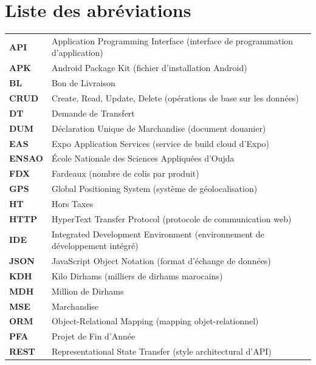 \documentclass[12pt,a4paper]{article}
\begin{document}
\newpage

    \renewcommand{\contentsname}{Table des matières}
    \renewcommand{\listfigurename}{Liste des figures}
    \setcounter{tocdepth}{1}
    \tableofcontents
\newpage
    \listoffigures
    \section*{Liste des abréviations}
    \begin{longtable}{p{2.5cm} p{12cm}}
    \textbf{API} & Application Programming Interface (interface de programmation d'application) \\
    \textbf{APK} & Android Package Kit (fichier d'installation Android) \\
    \textbf{BL} & Bon de Livraison \\
    \textbf{CRUD} & Create, Read, Update, Delete (opérations de base sur les données) \\
    \textbf{DT} & Demande de Transfert \\
    \textbf{DUM} & Déclaration Unique de Marchandise (document douanier) \\
    \textbf{EAS} & Expo Application Services (service de build cloud d'Expo) \\
    \textbf{ENSAO} & École Nationale des Sciences Appliquées d'Oujda \\
    \textbf{FDX} & Fardeaux (nombre de colis par produit) \\
    \textbf{GPS} & Global Positioning System (système de géolocalisation) \\
    \textbf{HT} & Hors Taxes \\
    \textbf{HTTP} & HyperText Transfer Protocol (protocole de communication web) \\
    \textbf{IDE} & Integrated Development Environment (environnement de développement intégré) \\
    \textbf{JSON} & JavaScript Object Notation (format d'échange de données) \\
    \textbf{KDH} & Kilo Dirhams (milliers de dirhams marocains) \\
    \textbf{MDH} & Million de Dirhams \\
    \textbf{MSE} & Marchandise \\
    \textbf{ORM} & Object-Relational Mapping (mapping objet-relationnel) \\
    \textbf{PFA} & Projet de Fin d'Année \\
    \textbf{REST} & Representational State Transfer (style architectural d'API) \\

\end{longtable}
\end{document}

